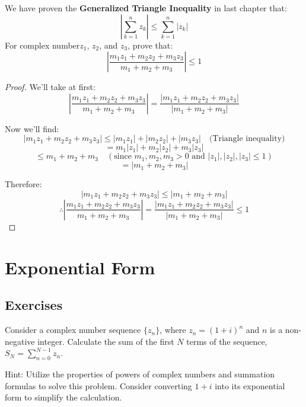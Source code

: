 \documentclass[
	12pt, %
	fleqn, %
	a4paper, %
]{LegrandOrangeBook}
\begin{document}
\begin{exercise}
    We have proven the \textbf{Generalized Triangle Inequality} in last chapter that:
    $$\left|\sum_{k=1}^{n} z_{k}\right| \leq \sum_{k=1}^{n}\left|z_{k}\right|$$
    For complex number$z_1$, $z_2$, and $z_3$, prove that:
    $$\left|\frac{m_{1} z_{1}+m_{2} z_{2}+m_{3} z_{3}}{m_{1}+m_{2}+m_{3}}\right| \leq 1$$
\end{exercise}
\begin{proof}
    
We'll take at first:
\[
\left| \frac{m_1z_1 + m_2z_2 + m_3z_3}{m_1 + m_2 + m_3} \right| = \frac{\left| m_1z_1 + m_2z_2 + m_3z_3 \right|}{\left| m_1 + m_2 + m_3 \right|}
\]

Now we'll find:
\[
\left| m_1z_1 + m_2z_2 + m_3z_3 \right| \leq \left| m_1z_1 \right| + \left| m_2z_2 \right| + \left| m_3z_3 \right| \quad \text{(Triangle inequality)}
\]
\[
= m_1 \left| z_1 \right| + m_2 \left| z_2 \right| + m_3 \left| z_3 \right|
\]
\[
\leq m_1 + m_2 + m_3 \quad (\text{since } m_1, m_2, m_3 > 0 \text{ and } \left| z_1 \right|, \left| z_2 \right|, \left| z_3 \right| \leq 1)
\]
\[
= \left| m_1 + m_2 + m_3 \right|
\]

Therefore:
\[
\left| m_1z_1 + m_2z_2 + m_3z_3 \right| \leq \left| m_1 + m_2 + m_3 \right|
\]
\[
\therefore \left| \frac{m_1z_1 + m_2z_2 + m_3z_3}{m_1 + m_2 + m_3} \right| = \frac{\left| m_1z_1 + m_2z_2 + m_3z_3 \right|}{\left| m_1 + m_2 + m_3 \right|} \leq 1
\]
\end{proof}

\section{Exponential Form}




\subsection{Exercises}


                \begin{exercise}
                    Consider a complex number sequence \(\{z_n\}\), where \(z_n = (1 + i)^n\) and \(n\) is a non-negative integer. Calculate the sum of the first \(N\) terms of the sequence, \(S_N = \sum_{n=0}^{N-1} z_n\).
                \end{exercise}
                Hint: Utilize the properties of powers of complex numbers and summation formulas to solve this problem. Consider converting \(1 + i\) into its exponential form to simplify the calculation.
               
\end{document}
